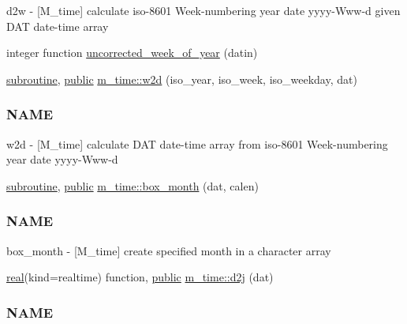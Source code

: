 \begin{DoxyCompactItemize}
\begin{DoxyCompactList}
d2w -\/ \mbox{[}M\+\_\+time\mbox{]} calculate iso-\/8601 Week-\/numbering year date yyyy-\/\+Www-\/d given D\+AT date-\/time array \end{DoxyCompactList}\item 
integer function \hyperlink{M__time_8f90_a4a68c5e906616f64da0c3d165fc41479}{uncorrected\+\_\+week\+\_\+of\+\_\+year} (datin)
\item 
\hyperlink{M__stopwatch_83_8txt_acfbcff50169d691ff02d4a123ed70482}{subroutine}, \hyperlink{M__stopwatch_83_8txt_a2f74811300c361e53b430611a7d1769f}{public} \hyperlink{namespacem__time_ac0ec48db8d508bfa23fe4b20c9d1c5a3}{m\+\_\+time\+::w2d} (iso\+\_\+year, iso\+\_\+week, iso\+\_\+weekday, dat)
\begin{DoxyCompactList}\small\item\em \subsubsection*{N\+A\+ME}

w2d -\/ \mbox{[}M\+\_\+time\mbox{]} calculate D\+AT date-\/time array from iso-\/8601 Week-\/numbering year date yyyy-\/\+Www-\/d \end{DoxyCompactList}\item 
\hyperlink{M__stopwatch_83_8txt_acfbcff50169d691ff02d4a123ed70482}{subroutine}, \hyperlink{M__stopwatch_83_8txt_a2f74811300c361e53b430611a7d1769f}{public} \hyperlink{namespacem__time_a0fe7540912df30d3578f3c469413aea8}{m\+\_\+time\+::box\+\_\+month} (dat, calen)
\begin{DoxyCompactList}\small\item\em \subsubsection*{N\+A\+ME}

box\+\_\+month -\/ \mbox{[}M\+\_\+time\mbox{]} create specified month in a character array \end{DoxyCompactList}\item 
\hyperlink{read__watch_83_8txt_abdb62bde002f38ef75f810d3a905a823}{real}(kind=realtime) function, \hyperlink{M__stopwatch_83_8txt_a2f74811300c361e53b430611a7d1769f}{public} \hyperlink{namespacem__time_a3fccc53c2650104eff084c7998d18f54}{m\+\_\+time\+::d2j} (dat)
\begin{DoxyCompactList}\small\item\em \subsubsection*{N\+A\+ME}


\end{DoxyCompactList}
\end{DoxyCompactItemize}
